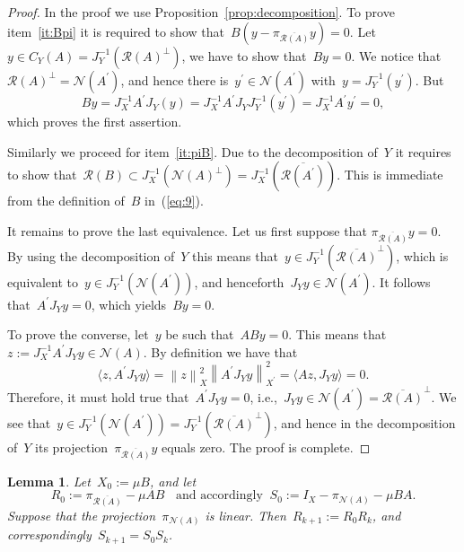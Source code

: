 \documentclass[12pt]{amsart}
\newcommand{\norm}[2]{\left\|#1\right\|_{#2}}
\newcommand{\scalar}[2]{\langle{ #1},{#2} \rangle}
\newcommand{\lr}[1]{\left(#1\right)}
\newcommand{\range}{\mathcal R}
\newcommand{\N}{\mathcal N}
\newcommand{\pr}{\pi_{\overline{\range(A)}}}
\newtheorem{lemma}{Lemma}
\theoremstyle{remark}
\begin{document}
\begin{proof}
  In the proof we use Proposition~\ref{prop:decomposition}.
  To prove item~\eqref{it:Bpi} it is required to show that~$B\lr{y -
    \pi_{\overline{\range(A)}}y} = 0$. Let $y\in C_Y(A)=
  J_{Y}^{-1}\lr{\range(A)^{\perp}}$,  we have to show that~$B y=0$.
 We notice that~$\range(A)^{\perp} = \N(A^{\prime})$, and hence there
  is~$y^{\prime}\in \N(A^{\prime})$ with~$y= J_{Y}^{-1}(y^{\prime})$.
  But
  $$
 B y = J_{X}^{-1} A^{\prime} J_{Y}(y) = J_{X}^{-1}
 A^{\prime} J_{Y}J_{Y}^{-1}(y^{\prime}) = J_{X}^{-1} A^{\prime}y^{\prime}= 0,
 $$
 which proves the first assertion.
 \par
 Similarly we proceed for item~\eqref{it:piB}. Due to the
 decomposition of~$Y$ it requires to show that~$\range(B)\subset
 J_{X}^{-1}\lr{\N(A)^{\perp}} =
 J_{X}^{-1}\lr{\overline{\range(A^{\prime})}}$.
 This is immediate from the definition of~$B$ in~(\ref{eq:9}).
 \par
 It remains to prove the last equivalence.
 Let us first suppose that \newline $\pr y =0$. By using the decomposition of~$Y$ this
 means that~$y \in J_{Y}^{-1}\lr{\overline{\range(A)}^{\perp}}$, which is
 equivalent to~$y\in J_{Y}^{-1}\lr{\N(A^{\prime})}$, and
 henceforth~$J_{Y}y \in \N(A^{\prime})$. It follows
 that~$A^{\prime}J_{Y}y=0$, which yields~$By=0$.
 \par
 To prove the converse, let~$y$ be such that~$ABy=0$. This means
 that~$z:= J_{X}^{-1}A^{\prime}J_{Y}y \in\N(A)$. By definition we have
 that
 $$
\scalar{z }{A^{\prime}J_{Y}y} = \norm{z}{X}^{2}
\norm{A^{\prime}J_{Y}y}{X^{\prime}}^{2} = \scalar{ A z }{J_{Y}y} =0.
$$
Therefore, it must hold true that~$A^{\prime}J_{Y}y=0$, i.e.,\
$J_{Y}y\in \N(A^{\prime}) = \overline{\range(A)}^{\perp}$. We see
that~$y\in J_{Y}^{-1}\lr{\N(A^{\prime})}=J_{Y}^{-1}\lr{
  \overline{\range(A)}^{\perp}} $, and hence in the decomposition
of~$Y$ its projection~$\pr y$ equals zero. The proof is complete.
\end{proof}
\begin{lemma}
  \label{lem:landweber}
      Let~$X_{0}:= \mu B$, and let
      $$
      R_{0}:=
      \pi_{\overline{\range(A)}} - \mu A B\;\; \text{ and
        accordingly}\;\; S_{0} :=
      I_{X} - \pi_{\N(A)} - \mu B A.
      $$
       Suppose that the projection~$\pi_{\N(A)}$ is linear.
      Then~$R_{k+1}:= R_{0}R_{k}$, and correspondingly~$S_{k+1}= S_{0}S_{k}$.
\end{lemma}
\end{document}
